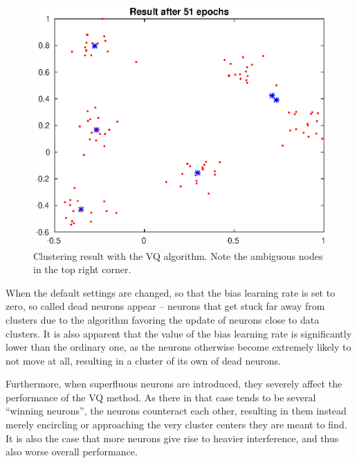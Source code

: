 \documentclass[a4paper,12pt]{article}
\theoremstyle{plain}
\theoremstyle{definition}
\begin{document}
      \begin{figure}[H]
         \centering
         \includegraphics[scale=.6]{1}
         \caption{Clustering result with the VQ algorithm. Note the ambiguous
         nodes in the top right corner. }
         \label{fig:1}
      \end{figure}
   
      When the default settings are changed, so that the bias learning rate is
      set to zero, so called dead neurons appear -- neurons that get stuck far
      away from clusters due to the algorithm favoring the update of neurons
      close to data clusters. It is also apparent that the value of the bias
      learning rate is significantly lower than the ordinary one, as the neurons
      otherwise become extremely likely to not move at all, resulting in a
      cluster of its own of dead neurons.

      Furthermore, when superfluous neurons are introduced, they severely affect
      the performance of the VQ method. As there in that case tends to be
      several ``winning neurons'', the neurons counteract each other, resulting
      in them instead merely encircling or approaching the very cluster centers they 
      are meant to find. It is also the case that more neurons give rise to heavier
      interference, and thus also worse overall performance.
      
\end{document}
